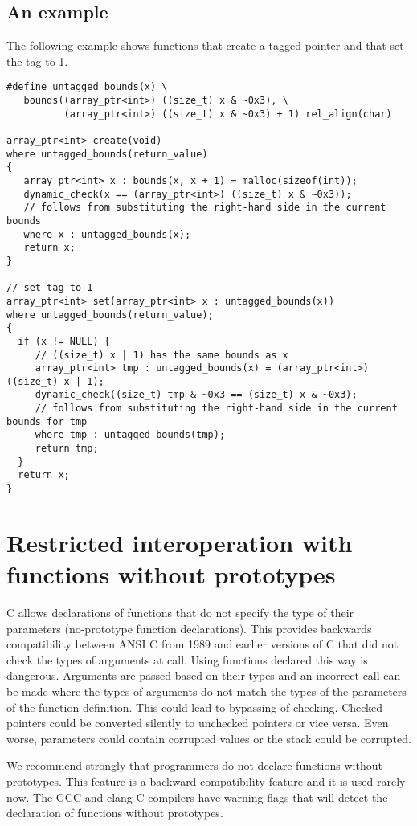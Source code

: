 \subsection{An example}

The following example shows functions that create a tagged pointer and 
that set the tag to 1.

\begin{verbatim}
#define untagged_bounds(x) \
   bounds((array_ptr<int>) ((size_t) x & ~0x3), \
          (array_ptr<int>) ((size_t) x & ~0x3) + 1) rel_align(char)

array_ptr<int> create(void) 
where untagged_bounds(return_value)
{
   array_ptr<int> x : bounds(x, x + 1) = malloc(sizeof(int));
   dynamic_check(x == (array_ptr<int>) ((size_t) x & ~0x3));
   // follows from substituting the right-hand side in the current bounds
   where x : untagged_bounds(x); 
   return x;
}

// set tag to 1
array_ptr<int> set(array_ptr<int> x : untagged_bounds(x)) 
where untagged_bounds(return_value);
{
  if (x != NULL) {
     // ((size_t) x | 1) has the same bounds as x                   
     array_ptr<int> tmp : untagged_bounds(x) = (array_ptr<int>) ((size_t) x | 1);
     dynamic_check((size_t) tmp & ~0x3 == (size_t) x & ~0x3);
     // follows from substituting the right-hand side in the current bounds for tmp
     where tmp : untagged_bounds(tmp);
     return tmp;
  }
  return x;
}
\end{verbatim}

\section{Restricted interoperation with functions without prototypes}
C allows declarations of functions that do not specify the type of their parameters
(no-prototype function declarations).  This provides backwards compatibility between 
ANSI C from 1989 and earlier versions of C that did not check the types of
arguments at call.  Using functions declared this way is
dangerous.  Arguments are passed based on their types and an incorrect call can be made
where the types of arguments do not match the types of the parameters of the function
definition.  This could lead to bypassing of checking.  Checked pointers could be 
converted silently to unchecked pointers or vice versa.  Even worse, parameters could contain
corrupted values or the stack could be corrupted.

We recommend strongly that programmers do not declare functions without prototypes.  This
feature is a backward compatibility feature and it is used rarely now.
The GCC and clang C compilers have warning flags that will detect the declaration of functions without 
prototypes.

